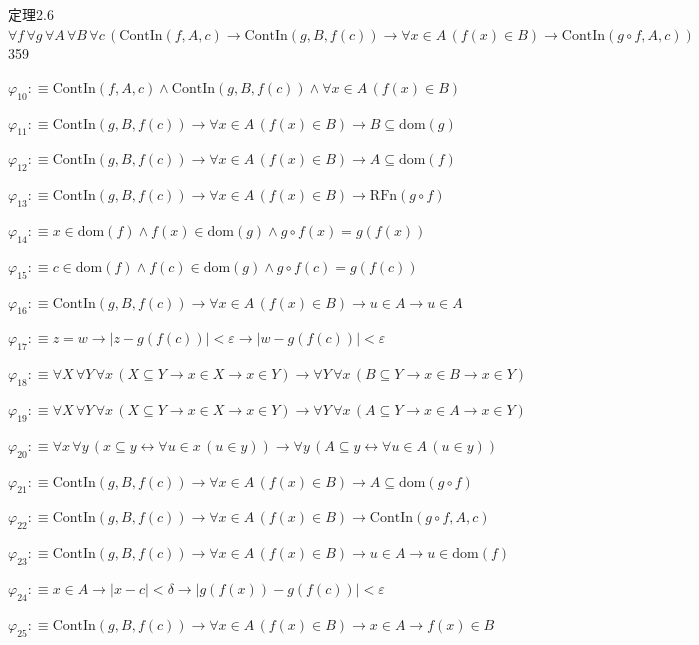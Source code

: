 \begin{fullproof}{定理2.6}{$\forall f\,\forall g\,\forall A\,\forall B\,\forall c\,(\mathrm{ContIn}(f,A,c) \to \mathrm{ContIn}(g,B,f(c)) \to \forall x \in A\,(f(x) \in B) \to \mathrm{ContIn}(g \circ f,A,c))$}{359}
\begin{abbrevlist}
\item $\varphi_{10} :\equiv \mathrm{ContIn}(f,A,c) \land \mathrm{ContIn}(g,B,f(c)) \land \forall x \in A\,(f(x) \in B)$
\item $\varphi_{11} :\equiv \mathrm{ContIn}(g,B,f(c)) \to \forall x \in A\,(f(x) \in B) \to B \subseteq \mathrm{dom}(g)$
\item $\varphi_{12} :\equiv \mathrm{ContIn}(g,B,f(c)) \to \forall x \in A\,(f(x) \in B) \to A \subseteq \mathrm{dom}(f)$
\item $\varphi_{13} :\equiv \mathrm{ContIn}(g,B,f(c)) \to \forall x \in A\,(f(x) \in B) \to \mathrm{RFn}(g \circ f)$
\item $\varphi_{14} :\equiv x \in \mathrm{dom}(f) \land f(x) \in \mathrm{dom}(g) \land g \circ f(x) = g(f(x))$
\item $\varphi_{15} :\equiv c \in \mathrm{dom}(f) \land f(c) \in \mathrm{dom}(g) \land g \circ f(c) = g(f(c))$
\item $\varphi_{16} :\equiv \mathrm{ContIn}(g,B,f(c)) \to \forall x \in A\,(f(x) \in B) \to u \in A \to u \in A$
\item $\varphi_{17} :\equiv z = w \to \lvert z - g(f(c)) \rvert < \varepsilon \to \lvert w - g(f(c)) \rvert < \varepsilon$
\item $\varphi_{18} :\equiv \forall X\,\forall Y\,\forall x\,(X \subseteq Y \to x \in X \to x \in Y) \to \forall Y\,\forall x\,(B \subseteq Y \to x \in B \to x \in Y)$
\item $\varphi_{19} :\equiv \forall X\,\forall Y\,\forall x\,(X \subseteq Y \to x \in X \to x \in Y) \to \forall Y\,\forall x\,(A \subseteq Y \to x \in A \to x \in Y)$
\item $\varphi_{20} :\equiv \forall x\,\forall y\,(x \subseteq y \leftrightarrow \forall u \in x\,(u \in y)) \to \forall y\,(A \subseteq y \leftrightarrow \forall u \in A\,(u \in y))$
\item $\varphi_{21} :\equiv \mathrm{ContIn}(g,B,f(c)) \to \forall x \in A\,(f(x) \in B) \to A \subseteq \mathrm{dom}(g \circ f)$
\item $\varphi_{22} :\equiv \mathrm{ContIn}(g,B,f(c)) \to \forall x \in A\,(f(x) \in B) \to \mathrm{ContIn}(g \circ f,A,c)$
\item $\varphi_{23} :\equiv \mathrm{ContIn}(g,B,f(c)) \to \forall x \in A\,(f(x) \in B) \to u \in A \to u \in \mathrm{dom}(f)$
\item $\varphi_{24} :\equiv x \in A \to \lvert x - c \rvert < \delta \to \lvert g(f(x)) - g(f(c)) \rvert < \varepsilon$
\item $\varphi_{25} :\equiv \mathrm{ContIn}(g,B,f(c)) \to \forall x \in A\,(f(x) \in B) \to x \in A \to f(x) \in B$

\end{abbrevlist}
\end{fullproof}
